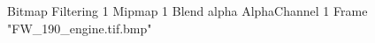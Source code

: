 {Bitmap
	{Filtering 1}
	{Mipmap 1}
	{Blend alpha}
	{AlphaChannel 1}
	{Frame "FW_190_engine.tif.bmp"}
}
